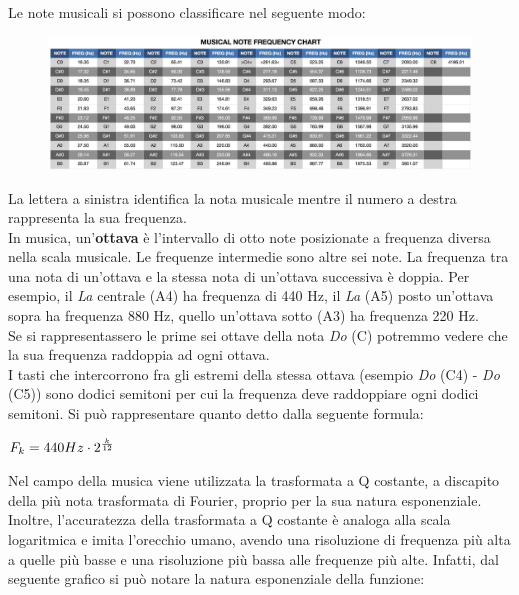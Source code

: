Le note musicali si possono classificare nel seguente modo:
\begin{figure}[H]
	\centering
	\includegraphics[scale=0.17]{./images/img4.jpg}
\end{figure}
\noindent La lettera a sinistra identifica la nota musicale mentre il numero a destra rappresenta la sua frequenza.\\
In musica, un'\textbf{ottava} è l'intervallo di otto note posizionate a frequenza diversa nella scala musicale. Le frequenze intermedie sono altre sei note. La frequenza tra una nota di un'ottava e la stessa nota di un'ottava successiva è doppia. Per esempio, il \textit{La} centrale (A4) ha frequenza di 440 Hz, il \textit{La} (A5) posto un'ottava sopra ha frequenza 880 Hz, quello un'ottava sotto (A3) ha frequenza 220 Hz.\\
Se si rappresentassero le prime sei ottave della nota \textit{Do} (C) potremmo vedere che la sua frequenza raddoppia ad ogni ottava.\\
\newline
I tasti che intercorrono fra gli estremi della stessa ottava (esempio \textit{Do} (C4) - \textit{Do} (C5)) sono dodici semitoni per cui la frequenza deve raddoppiare ogni dodici semitoni. Si può rappresentare quanto detto dalla seguente formula:
\vspace*{2ex}
\begin{center}
	\begin{math}
		F_{k}=440Hz \cdot 2^{k \over 12}
	\end{math}
\end{center}

Nel campo della musica viene utilizzata la trasformata a Q costante, a discapito della più nota trasformata di Fourier, proprio per la sua natura esponenziale. Inoltre, l'accuratezza della trasformata a Q costante è analoga alla scala logaritmica e imita l'orecchio umano, avendo una risoluzione di frequenza più alta a quelle più basse e una risoluzione più bassa alle frequenze più alte. Infatti, dal seguente grafico si può notare la natura esponenziale della funzione:
\vspace*{2ex}
\begin{center}
\end{center}